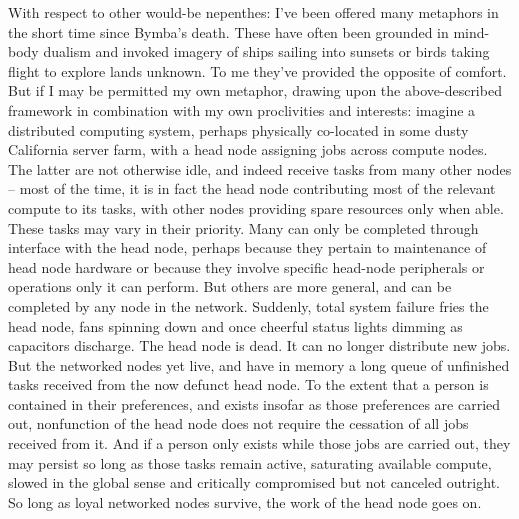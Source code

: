 \documentclass[twoside,10pt]{article}
\begin{document}
\begin{article*}
With respect to other would-be nepenthes: I’ve been offered many metaphors in the short time since Bymba’s death. These have often been grounded in mind-body dualism and invoked imagery of ships sailing into sunsets or birds taking flight to explore lands unknown. To me they’ve provided the opposite of comfort. But if I may be permitted my own metaphor, drawing upon the above-described framework in combination with my own proclivities and interests: imagine a distributed computing system, perhaps physically co-located in some dusty California server farm, with a head node assigning jobs across compute nodes. The latter are not otherwise idle, and indeed receive tasks from many other nodes – most of the time, it is in fact the head node contributing most of the relevant compute to its tasks, with other nodes providing spare resources only when able. These tasks may vary in their priority. Many can only be completed through interface with the head node, perhaps because they pertain to maintenance of head node hardware or because they involve specific head-node peripherals or operations only it can perform. But others are more general, and can be completed by any node in the network. Suddenly, total system failure fries the head node, fans spinning down and once cheerful status lights dimming as capacitors discharge. The head node is dead. It can no longer distribute new jobs. But the networked nodes yet live, and have in memory a long queue of unfinished tasks received from the now defunct head node. To the extent that a person is contained in their preferences, and exists insofar as those preferences are carried out, nonfunction of the head node does not require the cessation of all jobs received from it. And if a person only exists while those jobs are carried out, they may persist so long as those tasks remain active, saturating available compute, slowed in the global sense and critically compromised but not canceled outright. So long as loyal networked nodes survive, the work of the head node goes on.
\\


\end{article*}
\end{document}
